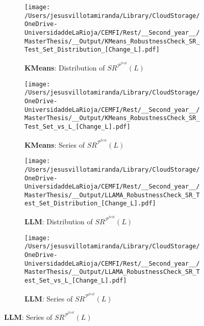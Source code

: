 \begin{figure}[H]
  \centering
  \caption{Sensitivity of $SR^{\mathcal P^{test}}$ to the holding window length ($L$)}
    \begin{subfigure}[b]{0.44\textwidth}
    \centering
    \texttt{[image: /Users/jesusvillotamiranda/Library/CloudStorage/OneDrive-UniversidaddeLaRioja/CEMFI/Rest/\_\_Second\_year\_\_/MasterThesis/\_\_Output/KMeans\_RobustnessCheck\_SR\_Test\_Set\_Distribution\_[Change\_L].pdf]}
    \caption{\textbf{KMeans}: Distribution of $SR^{\mathcal P^{test}}(L)$}
    \label{fig:KMeans_Robustness_L_Distr}
  \end{subfigure}
  \hspace{0.05\textwidth} %
  \begin{subfigure}[b]{0.44\textwidth}
    \centering
    \texttt{[image: /Users/jesusvillotamiranda/Library/CloudStorage/OneDrive-UniversidaddeLaRioja/CEMFI/Rest/\_\_Second\_year\_\_/MasterThesis/\_\_Output/KMeans\_RobustnessCheck\_SR\_Test\_Set\_vs\_L\_[Change\_L].pdf]}
    \caption{\textbf{KMeans}: Series of $SR^{\mathcal P^{test}}(L)$}
    \label{fig:KMeans_Robustness_L_Series}
  \end{subfigure}
  
  \bx 
      \begin{subfigure}[b]{0.44\textwidth}
    \centering
    \texttt{[image: /Users/jesusvillotamiranda/Library/CloudStorage/OneDrive-UniversidaddeLaRioja/CEMFI/Rest/\_\_Second\_year\_\_/MasterThesis/\_\_Output/LLAMA\_RobustnessCheck\_SR\_Test\_Set\_Distribution\_[Change\_L].pdf]}
    \caption{\textbf{LLM}: Distribution of $SR^{\mathcal P^{test}}(L)$}
    \label{fig:LLM_Robustness_L_Distr}
  \end{subfigure}
  \hspace{0.05\textwidth} %
  \begin{subfigure}[b]{0.44\textwidth}
    \centering
    \texttt{[image: /Users/jesusvillotamiranda/Library/CloudStorage/OneDrive-UniversidaddeLaRioja/CEMFI/Rest/\_\_Second\_year\_\_/MasterThesis/\_\_Output/LLAMA\_RobustnessCheck\_SR\_Test\_Set\_vs\_L\_[Change\_L].pdf]}
    \caption{\textbf{LLM}: Series of $SR^{\mathcal P^{test}}(L)$}
    \label{fig:LLM_Robustness_L_Series}
  \end{subfigure}

\label{fig:LLM_Robustness_L}
\end{figure}


